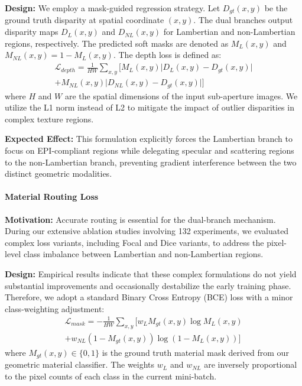\documentclass[lettersize,journal]{IEEEtran}
\begin{document}
\textbf{Design:} We employ a mask-guided regression strategy. Let $D_{gt}(x,y)$ be the ground truth disparity at spatial coordinate $(x,y)$. The dual branches output disparity maps $D_{L}(x,y)$ and $D_{NL}(x,y)$ for Lambertian and non-Lambertian regions, respectively. The predicted soft masks are denoted as $M_{L}(x,y)$ and $M_{NL}(x,y) = 1 - M_{L}(x,y)$. The depth loss is defined as:
\begin{multline}
\mathcal{L}_{depth} = \frac{1}{HW} \sum_{x,y} \Big[ M_{L}(x,y) \big| D_{L}(x,y) - D_{gt}(x,y) \big| \\
+ M_{NL}(x,y) \big| D_{NL}(x,y) - D_{gt}(x,y) \big| \Big]
\label{eq:ch3_24}
\end{multline}
where $H$ and $W$ are the spatial dimensions of the input sub-aperture images. We utilize the L1 norm instead of L2 to mitigate the impact of outlier disparities in complex texture regions.

\textbf{Expected Effect:} This formulation explicitly forces the Lambertian branch to focus on EPI-compliant regions while delegating specular and scattering regions to the non-Lambertian branch, preventing gradient interference between the two distinct geometric modalities.

\paragraph{Material Routing Loss}
\textbf{Motivation:} Accurate routing is essential for the dual-branch mechanism. During our extensive ablation studies involving 132 experiments, we evaluated complex loss variants, including Focal and Dice variants, to address the pixel-level class imbalance between Lambertian and non-Lambertian regions.

\textbf{Design:} Empirical results indicate that these complex formulations do not yield substantial improvements and occasionally destabilize the early training phase. Therefore, we adopt a standard Binary Cross Entropy (BCE) loss with a minor class-weighting adjustment:
\begin{multline}
\mathcal{L}_{mask} = -\frac{1}{HW} \sum_{x,y} \Big[ w_{L} M_{gt}(x,y) \log M_{L}(x,y) \\
+ w_{NL} (1 - M_{gt}(x,y)) \log (1 - M_{L}(x,y)) \Big]
\label{eq:ch3_25}
\end{multline}
where $M_{gt}(x,y) \in \{0, 1\}$ is the ground truth material mask derived from our geometric material classifier. The weights $w_{L}$ and $w_{NL}$ are inversely proportional to the pixel counts of each class in the current mini-batch.
\end{document}
